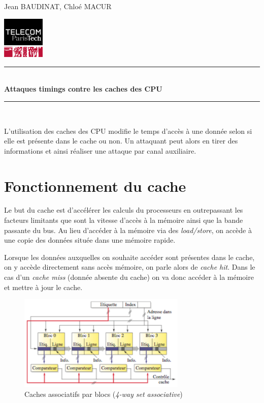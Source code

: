 \documentclass[a4paper,11pt]{article}
\newcommand{\HRule}{\rule{\linewidth}{0.5mm}}
\newcommand{\reporttitle}{Attaques timings contre les caches des CPU} %
\newcommand{\reportauthor}{Jean BAUDINAT, Chloé MACUR}
\begin{document}
	

\begin{center}

\begin{minipage}[t]{0.4\textwidth}
  \begin{flushleft} \large
    \reportauthor
  \vfill
  \end{flushleft}
\end{minipage}
\begin{minipage}[t]{0.5\textwidth}
  \begin{flushright}
  \includegraphics [width=20mm]{figures/tpt.jpg}
  \end{flushright}
\end{minipage}
\HRule \\[0.4cm]
{\huge \bfseries \reporttitle}\\[0.1cm]
\HRule \\
\end{center}

L'utilisation des caches des CPU modifie le temps d'accès à une donnée selon si elle est présente dans le cache ou non. Un attaquant peut alors en tirer des informations et ainsi réaliser une attaque par canal auxiliaire.

\section{Fonctionnement du cache}

Le but du cache est d'accélérer les calculs du processeurs en outrepassant les facteurs limitants que sont la vitesse d'accès à la mémoire ainsi que la bande passante du bus. Au lieu d'accéder à la mémoire via des \emph{load/store}, on accède à une copie des données située dans une mémoire rapide.

Lorsque les données auxquelles on souhaite accéder sont présentes dans le cache, on y accède directement sans accès mémoire, on parle alors de \emph{cache hit}. Dans le cas d'un \emph{cache miss} (donnée absente du cache) on va donc accéder à la mémoire et mettre à jour le cache.
  
\begin{figure}[h]
  \centering
  \includegraphics[width=8cm]{figures/cache_associative.png}
  \caption{Caches associatifs par blocs (\emph{4-way set associative})}
  \label{cache} 
\end{figure}
\end{document}
